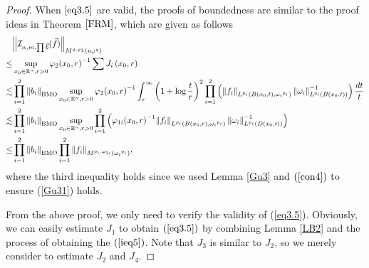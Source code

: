 \documentclass[11pt, twoside, leqno]{article}
\begin{document}
\begin{proof}[Proof]
	When $\eqref{eq3.5}$ are valid, the proofs of boundedness are similar to the proof ideas in Theorem $\ref{FRM}$, which are given as follows
	\begin{align*}
	&{\left\| {{{{\mathcal I}_{\alpha,m,\prod {\vec b} }}}(\vec f)} \right\|_{{M^{q,{\varphi _2}}}\left( {{u_{\vec \omega }}^q} \right)}}\\
	\le& \mathop {\sup }\limits_{{x_0} \in {\mathbb R^n},r > 0} {\varphi _2}{\left( {{x_0},r} \right)^{ - 1}}\sum {J_i\left( {x_0},r \right)}\\
	\lesssim& \prod\limits_{i = 1}^2 {{{\left\| {{b_i}} \right\|}_{\rm BMO}}} \mathop {\sup }\limits_{{x_0} \in {{\mathbb R^n}},r > 0} {\varphi _2}{\left( {{x_0},r} \right)^{ - 1}}\int_r^\infty  {{{\left( {1 + \log \frac{t}{r}} \right)}^2}\prod\limits_{i = 1}^2 {\left( {{{\left\| {{f_i}} \right\|}_{{L^{{p_i}}}(B({x_0},t),{\omega _i}^{{p_i}})}}\left\| {{\omega _i}} \right\|_{{L^{{q_i}}}(B({x_0},t))}^{ - 1}} \right)\frac{{dt}}{t}} }\\
	\lesssim& \prod\limits_{i = 1}^2 {{{\left\| {{b_i}} \right\|}_{\rm BMO}}} \mathop {\sup }\limits_{{x_0} \in {{\mathbb R^n}},r > 0} \prod\limits_{i = 1}^2 {\left( {{\varphi _{1i}}{{\left( {{x_0},r} \right)}^{ - 1}}{{\left\| {{f_i}} \right\|}_{{L^{{p_i}}}(B({x_0},r),{\omega _i}^{{p_i}})}}\left\| {{\omega _i}} \right\|_{{L^{{p_i}}}(D({x_0},t))}^{ - 1}} \right)}\\
	\le& \prod\limits_{i = 1}^2 {{{\left\| {{b_i}} \right\|}_{\rm BMO}}} \prod\limits_{i = 1}^2 {{{\left\| {{f_i}} \right\|}_{{M^{{p_i},{\varphi _{1i}}}}({\omega _i}^{p_i})}}},
	\end{align*}
	where the third inequality holds since we used Lemma \ref{Gu3} and $(\ref{con4})$ to ensure (\ref{Gu31}) holds.
	
	From the above proof, we only need to verify the validity of (\ref{eq3.5}). Obviously, we can easily estimate $J_1$ to obtain $(\ref{eq3.5})$ by combining Lemma \ref{LB2} and the process of obtaining the $(\ref{ieq5})$. Note that ${J_{3}}$ is similar to ${J_{2}}$, so we merely consider to estimate ${J_{2}}$ and ${J_{4}}$.
	

\end{proof}
\end{document}
